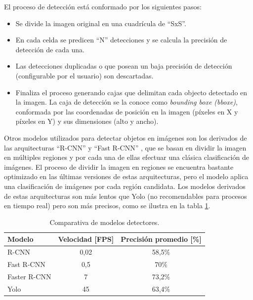 
El proceso de detección está conformado por los siguientes pasos:

\begin{itemize}
\item Se divide la imagen original en una cuadrícula de ``SxS''.
\item En cada celda se predicen ``N'' detecciones y se calcula la precisión de detección de cada una.
\item Las detecciones duplicadas o que posean un baja precisión de detección (configurable por el usuario) son descartadas.
\item Finaliza el proceso generando cajas que delimitan cada objecto detectado en la imagen. La caja de detección se la conoce como \textit{bounding boxe (bboxe)}, conformada por las coordenadas de posición en la imagen (píxeles en X y píxeles en Y) y sus dimensiones (alto y ancho).

\end{itemize}


Otros modelos utilizados para detectar objetos en imágenes son los derivados de las arquitecturas ``R-CNN'' y ``Fast R-CNN'' \citep{RCNN}, que se basan en dividir la imagen en múltiples regiones y por cada una de ellas efectuar una clásica clasificación de imágenes. El proceso de dividir la imagen en regiones se encuentra bastante optimizado en las últimas versiones de estas arquitecturas, pero el modelo aplica una clasificación de imágenes por cada región candidata. Los modelos derivados de estas arquitecturas son más lentos que Yolo (no recomendables para procesos en tiempo real) pero son más precisos, como se ilustra en la tabla \ref{tab:comparativaDetectores}.

\begin{table}[h]
	\centering
	\caption[Comparativa de modelos detectores]{Comparativa de modelos detectores.}
	\begin{tabular}{l c c}    
		\toprule
		\textbf{Modelo}   & \textbf{Velocidad [FPS]} & \textbf{Precisión promedio [\%]} \\
		\midrule
		R-CNN & 0,02 & 58,5\% \\
		Fast R-CNN & 0,5 & 70\% \\
		Faster R-CNN & 7 & 73,2\% \\
		Yolo & 45 & 63,4\% \\
		\bottomrule
		\hline
	\end{tabular}
	\label{tab:comparativaDetectores}
\end{table}

